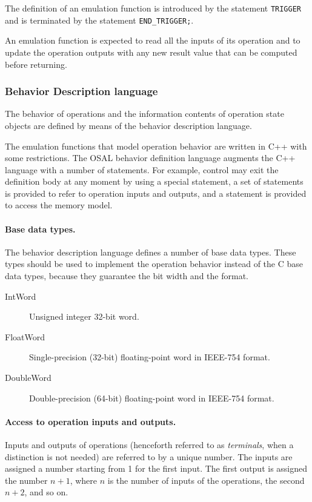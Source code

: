 \documentclass[twoside]{tceusermanual}
\begin{document}
The definition of an emulation function is introduced by the statement
\verb#TRIGGER# and is terminated by the statement \verb#END_TRIGGER;#.  

An emulation function is expected to read all the inputs of its operation
and to update the operation outputs with any new result value that can be
computed before returning.

\subsubsection{Behavior Description language}
\label{ssec:behaviour-commands}

The behavior of operations and the information contents of operation state
objects are defined by means of the behavior description language.

The emulation functions that model operation behavior are written in C++
with some restrictions.
The  OSAL behavior definition
language augments the C++ language with a number of statements.  For
example, 
control may exit the definition body at any moment by using a special 
statement, a set of statements is provided to refer to operation inputs
and 
outputs, and a statement is provided to access the memory model.

\paragraph{Base data types.}
The behavior description language defines a number of base data
types.  These types should be used to implement the operation behavior
instead of the C base data types, because they guarantee the bit width and
the format.
\begin{description}
\item[IntWord] %
  Unsigned integer 32-bit word.
\item[FloatWord] %
  Single-precision (32-bit) floating-point word in IEEE-754 format.
\item[DoubleWord] %
  Double-precision (64-bit) floating-point word in IEEE-754 format.
\end{description}

\paragraph{Access to operation inputs and outputs.}
Inputs and outputs of operations (henceforth referred to as
\emph{terminals}, when a distinction is not needed) are referred to by a
unique number.  The inputs are assigned a number starting from 1 for the
first input.  The first output is assigned the number $n+1$, where $n$ is
the number of inputs of the operations, the second $n+2$, and so on.
\end{document}
